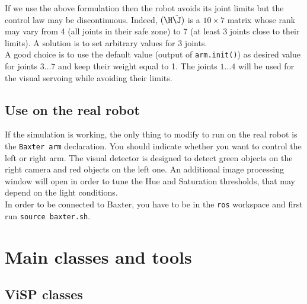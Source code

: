 \documentclass{ecnreport}
\begin{document}
If we use the above formulation then the robot avoids its joint limits but the control law may be discontinuous. Indeed, $(\H\tilde\J)$ is a $10\times 7$ matrix whose rank may vary from 4 (all joints in their safe zone) to 7 (at least 3 joints close to their limits). A solution is to set arbitrary values for 3 joints. \\

A good choice is to use the default value (output of \texttt{arm.init()}) as desired value for joints $3\hdots7$ and keep their weight equal to 1. 
The joints $1\hdots 4$ will be used for the visual servoing while avoiding their limits.

\subsection{Use on the real robot}

If the simulation is working, the only thing to modify to run on the real robot is the \texttt{Baxter arm} declaration. You should indicate whether you want to control the left or right arm. The visual detector is designed to detect green objects on the right camera and red objects on the left one. An additional image processing window will open in order to tune the Hue and Saturation thresholds, that may depend on the light conditions.\\

In order to be connected to Baxter, you have to be in the \texttt{ros} workspace and first run \texttt{source baxter.sh}. 

\appendix

\section{Main classes and tools}\label{sec:classes}

\subsection{ViSP classes}
\end{document}
